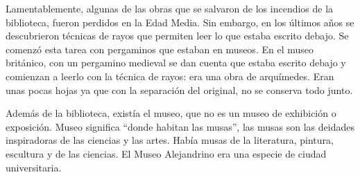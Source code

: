 Lamentablemente, algunas de las obras que se salvaron de los incendios de la biblioteca, fueron perdidos en la Edad Media. Sin embargo, en los últimos años se descubrieron técnicas de rayos que permiten leer lo que estaba escrito debajo. Se comenzó esta tarea con pergaminos que estaban en museos. En el museo británico, con un pergamino medieval se dan cuenta que estaba escrito debajo y comienzan a leerlo con la técnica de rayos: era una obra de arquímedes. Eran unas pocas hojas ya que con la separación del original, no se conserva todo junto. 

Además de la biblioteca, existía el museo, que no es un museo de exhibición o exposición. Museo significa “donde habitan las musas”, las musas son las deidades inspiradoras de las ciencias y las artes. Había musas de la literatura, pintura, escultura y de las ciencias. El Museo Alejandrino era una especie de ciudad universitaria. 
